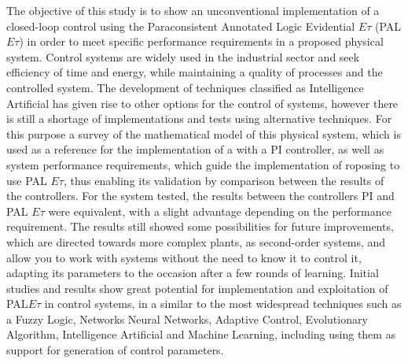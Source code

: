 





The objective of this study is to show an unconventional implementation
of a closed-loop control using the Paraconsistent 
Annotated Logic Evidential $E\tau$ (PAL $E\tau$)
in order to meet specific performance requirements in a proposed physical system.
Control systems are widely used in the industrial sector and
seek efficiency of time and energy,
while maintaining a quality of processes and the controlled system.
The development of techniques classified as Intelligence
Artificial has given rise to other options for the control of systems,
however there is still a shortage of implementations and tests using alternative techniques.
For this purpose a survey of the mathematical model of this
physical system, which is used as a reference for the implementation of a
with a PI controller,
as well as system performance requirements,
which guide the implementation of roposing to use PAL $E\tau$,
thus enabling its validation by comparison between the results of the controllers.
For the system tested,
the results between the controllers
PI and PAL $E\tau$ were equivalent,
with a slight advantage depending on the
performance requirement.
The results still showed some
possibilities for future improvements,
which are directed towards more complex plants,
as second-order systems,
and allow you to work with systems
without the need to know it to control it,
adapting its parameters to the occasion
after a few rounds of learning.
Initial studies and results show great potential for
implementation and exploitation of PAL$E\tau$ in control systems, in a
similar to the most widespread techniques such as a Fuzzy Logic, Networks
Neural Networks, Adaptive Control, Evolutionary Algorithm, Intelligence
Artificial and Machine Learning, including
using them as support for generation of control parameters.
